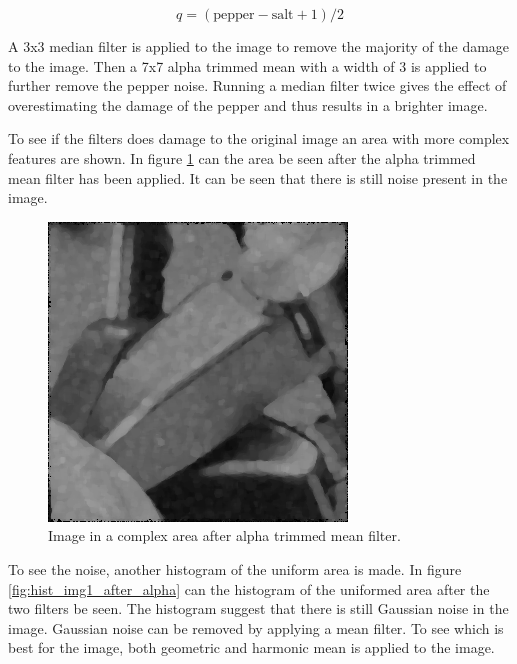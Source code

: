 \begin{equation}
 q = (\text{pepper}-\text{salt}+1)/2 \label{eq:quantile}
\end{equation}

A 3x3 median filter is applied to the image to remove the majority of the damage to the image.
Then a 7x7 alpha trimmed mean with a width of 3 is applied to further remove the pepper noise.
Running a median filter twice gives the effect of overestimating the damage of the pepper and thus results in a brighter image.

To see if the filters does damage to the original image an area with more complex features are shown.
In figure \ref{fig:complex1_after_alpha} can the area be seen after the alpha trimmed mean filter has been applied.
It can be seen that there is still noise present in the image.

\begin{figure}[H]
\centering
\includegraphics[width = \cutOutWidth]{graphics/complex1_step2}
\caption{Image in a complex area after alpha trimmed mean filter.}
\label{fig:complex1_after_alpha}
\end{figure}

To see the noise, another histogram of the uniform area is made.
In figure \ref{fig:hist_img1_after_alpha} can the histogram of the uniformed area after the two filters be seen.
The histogram suggest that there is still Gaussian noise in the image.
Gaussian noise can be removed by applying a mean filter.
To see which is best for the image, both geometric and harmonic mean is applied to the image.

